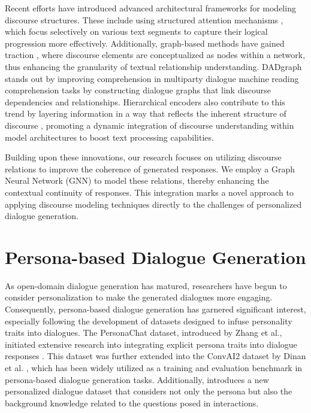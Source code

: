 Recent efforts have introduced advanced architectural frameworks for modeling discourse structures. These include using structured attention mechanisms \cite{cohan-etal-2018-discourse}, which focus selectively on various text segments to capture their logical progression more effectively. Additionally, graph-based methods have gained traction \cite{dong-etal-2021-discourse} \cite{feng-etal-2021-dialogue}, where discourse elements are conceptualized as nodes within a network, thus enhancing the granularity of textual relationship understanding. DADgraph \cite{li-etal-2021-dadgraph} stands out by improving comprehension in multiparty dialogue machine reading comprehension tasks by constructing dialogue graphs that link discourse dependencies and relationships. Hierarchical encoders also contribute to this trend by layering information in a way that reflects the inherent structure of discourse \cite{pasunuru-etal-2021-data} \cite{cao-wang-2022-hibrids}, promoting a dynamic integration of discourse understanding within model architectures to boost text processing capabilities.

Building upon these innovations, our research focuses on utilizing discourse relations to improve the coherence of generated responses. We employ a Graph Neural Network (GNN) to model these relations, thereby enhancing the contextual continuity of responses. This integration marks a novel approach to applying discourse modeling techniques directly to the challenges of personalized dialogue generation.

\section{Persona-based Dialogue Generation}
As open-domain dialogue generation has matured, researchers have begun to consider personalization to make the generated dialogues more engaging. Consequently, persona-based dialogue generation has garnered significant interest, especially following the development of datasets designed to infuse personality traits into dialogues. The PersonaChat dataset, introduced by Zhang et al., initiated extensive research into integrating explicit persona traits into dialogue responses \cite{zhang-etal-2018-personalizing}. This dataset was further extended into the ConvAI2 dataset by Dinan et al. \cite{dinan-etal-2019-convai2}, which has been widely utilized as a training and evaluation benchmark in persona-based dialogue generation tasks. Additionally, \cite{jang-etal-2022-focus} introduces a new personalized dialogue dataset that considers not only the persona but also the background knowledge related to the questions posed in interactions.

